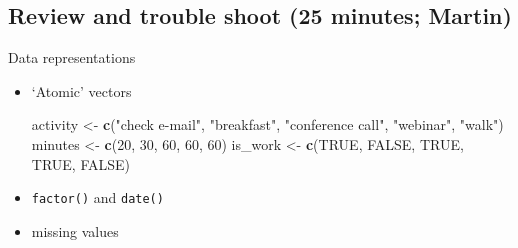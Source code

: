 \documentclass[
]{book}
\newenvironment{Shaded}{\begin{snugshade}}{\end{snugshade}}
\newcommand{\DataTypeTok}[1]{\textcolor[rgb]{0.13,0.29,0.53}{#1}}
\newcommand{\DecValTok}[1]{\textcolor[rgb]{0.00,0.00,0.81}{#1}}
\newcommand{\KeywordTok}[1]{\textcolor[rgb]{0.13,0.29,0.53}{\textbf{#1}}}
\newcommand{\NormalTok}[1]{#1}
\newcommand{\OtherTok}[1]{\textcolor[rgb]{0.56,0.35,0.01}{#1}}
\newcommand{\StringTok}[1]{\textcolor[rgb]{0.31,0.60,0.02}{#1}}
\begin{document}
\hypertarget{review-and-trouble-shoot-25-minutes-martin}{%
\subsection{Review and trouble shoot (25 minutes; Martin)}\label{review-and-trouble-shoot-25-minutes-martin}}

Data representations

\begin{itemize}
\item
  `Atomic' vectors

\begin{Shaded}
\begin{Highlighting}[]
\NormalTok{activity <-}\StringTok{ }\KeywordTok{c}\NormalTok{(}\StringTok{"check e-mail"}\NormalTok{, }\StringTok{"breakfast"}\NormalTok{, }\StringTok{"conference call"}\NormalTok{, }\StringTok{"webinar"}\NormalTok{, }\StringTok{"walk"}\NormalTok{)}
\NormalTok{minutes <-}\StringTok{ }\KeywordTok{c}\NormalTok{(}\DecValTok{20}\NormalTok{, }\DecValTok{30}\NormalTok{, }\DecValTok{60}\NormalTok{, }\DecValTok{60}\NormalTok{, }\DecValTok{60}\NormalTok{)}
\NormalTok{is_work <-}\StringTok{ }\KeywordTok{c}\NormalTok{(}\OtherTok{TRUE}\NormalTok{, }\OtherTok{FALSE}\NormalTok{, }\OtherTok{TRUE}\NormalTok{, }\OtherTok{TRUE}\NormalTok{, }\OtherTok{FALSE}\NormalTok{)}
\end{Highlighting}
\end{Shaded}
\item
  \texttt{factor()} and \texttt{date()}

\begin{Shaded}
\end{Shaded}
\item
  missing values


\end{itemize}
\end{document}
